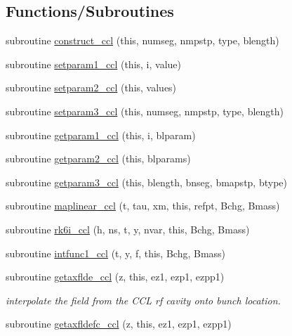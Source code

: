 \subsection*{Functions/\+Subroutines}
\begin{DoxyCompactItemize}
\item 
subroutine \mbox{\hyperlink{namespacecclclass_af38d062f04c18827d1d2a76c17039c58}{construct\+\_\+ccl}} (this, numseg, nmpstp, type, blength)
\item 
subroutine \mbox{\hyperlink{namespacecclclass_adf1829da601e1090ce5f5e5046c4d62c}{setparam1\+\_\+ccl}} (this, i, value)
\item 
subroutine \mbox{\hyperlink{namespacecclclass_a7bc5a807438db526489d8773fa168375}{setparam2\+\_\+ccl}} (this, values)
\item 
subroutine \mbox{\hyperlink{namespacecclclass_a5a90756fe0684d2f29121a368dbef489}{setparam3\+\_\+ccl}} (this, numseg, nmpstp, type, blength)
\item 
subroutine \mbox{\hyperlink{namespacecclclass_a3cb17684a6eef64dd3c35cbb03bcb8b3}{getparam1\+\_\+ccl}} (this, i, blparam)
\item 
subroutine \mbox{\hyperlink{namespacecclclass_ad1c56a9447d1ff854afdc5502ae0fe18}{getparam2\+\_\+ccl}} (this, blparams)
\item 
subroutine \mbox{\hyperlink{namespacecclclass_ad223096667fbe2e53bae56b52b2350fa}{getparam3\+\_\+ccl}} (this, blength, bnseg, bmapstp, btype)
\item 
subroutine \mbox{\hyperlink{namespacecclclass_a2efbf5186624893a0f213ca40968c198}{maplinear\+\_\+ccl}} (t, tau, xm, this, refpt, Bchg, Bmass)
\item 
subroutine \mbox{\hyperlink{namespacecclclass_a6dd4075592b69b308b61e3ee2f065517}{rk6i\+\_\+ccl}} (h, ns, t, y, nvar, this, Bchg, Bmass)
\item 
subroutine \mbox{\hyperlink{namespacecclclass_a09adb3ba980646f12eb22fddbd4c962d}{intfunc1\+\_\+ccl}} (t, y, f, this, Bchg, Bmass)
\item 
subroutine \mbox{\hyperlink{namespacecclclass_a881db4a51cdc73a6c489b2814565a243}{getaxflde\+\_\+ccl}} (z, this, ez1, ezp1, ezpp1)
\begin{DoxyCompactList}\small\item\em interpolate the field from the C\+CL rf cavity onto bunch location. \end{DoxyCompactList}\item 
subroutine \mbox{\hyperlink{namespacecclclass_a06d52f7ecb50e977ef5e2330506180d2}{getaxfldefc\+\_\+ccl}} (z, this, ez1, ezp1, ezpp1)

\end{DoxyCompactItemize}
